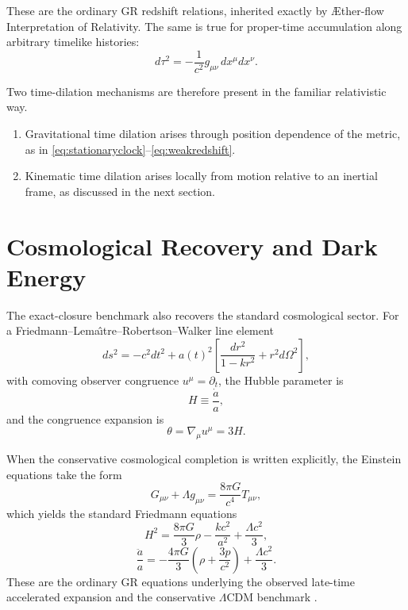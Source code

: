 \documentclass[11pt]{article}
\newcommand{\Aflow}{\AE{}ther-flow}
\newcommand{\TheoryName}{\Aflow{} Interpretation of Relativity}
\begin{document}
These are the ordinary GR redshift relations, inherited exactly by \TheoryName{}. The same is true for proper-time accumulation along arbitrary timelike histories:
\begin{equation}
d\tau^2
=
-\frac{1}{c^2}g_{\mu\nu}\,dx^\mu dx^\nu.
\label{eq:propertime}
\end{equation}

Two time-dilation mechanisms are therefore present in the familiar relativistic way.
\begin{enumerate}
    \item Gravitational time dilation arises through position dependence of the metric, as in \eqref{eq:stationaryclock}--\eqref{eq:weakredshift}.
    \item Kinematic time dilation arises locally from motion relative to an inertial frame, as discussed in the next section.
\end{enumerate}

\section{Cosmological Recovery and Dark Energy}

The exact-closure benchmark also recovers the standard cosmological sector. For a Friedmann--Lema\^\i tre--Robertson--Walker line element
\begin{equation}
ds^2
=
-c^2dt^2
+a(t)^2\left[\frac{dr^2}{1-kr^2}+r^2 d\Omega^2\right],
\label{eq:flrwmetric}
\end{equation}
with comoving observer congruence \(u^\mu=\partial_t\), the Hubble parameter is
\begin{equation}
H \equiv \frac{\dot a}{a},
\label{eq:hubble}
\end{equation}
and the congruence expansion is
\begin{equation}
\theta = \nabla_\mu u^\mu = 3H.
\label{eq:theta3h}
\end{equation}

When the conservative cosmological completion is written explicitly, the Einstein equations take the form
\begin{equation}
G_{\mu\nu}+\Lambda g_{\mu\nu}
=
\frac{8\pi G}{c^4}T_{\mu\nu},
\label{eq:einstein_cosmo}
\end{equation}
which yields the standard Friedmann equations
\begin{equation}
H^2
=
\frac{8\pi G}{3}\rho
-\frac{k c^2}{a^2}
+\frac{\Lambda c^2}{3},
\label{eq:friedmann1}
\end{equation}
\begin{equation}
\frac{\ddot a}{a}
=
-\frac{4\pi G}{3}\left(\rho+\frac{3p}{c^2}\right)
+\frac{\Lambda c^2}{3}.
\label{eq:friedmann2}
\end{equation}
These are the ordinary GR equations underlying the observed late-time accelerated expansion and the conservative \(\Lambda\)CDM benchmark \cite{Riess1998,Perlmutter1999,Planck2018Parameters}.
\end{document}
